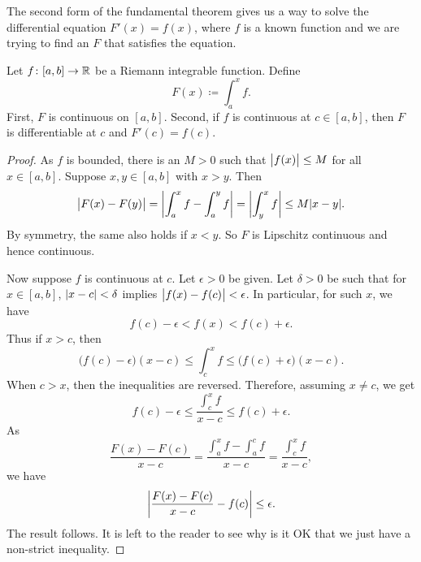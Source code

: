 The second form of the fundamental theorem gives us a way to solve
the differential equation $F'(x) = f(x)$, where $f$ is a known
function and we are trying to find an $F$ that satisfies the equation.

\begin{thm} \label{thm:FTCv2}
Let $f \colon [a,b] \to {\mathbb{R}}$ be a Riemann integrable function.  Define
\begin{equation*}
F(x) \coloneqq \int_a^x f .
\end{equation*}
First, $F$ is continuous on $[a,b]$.  Second,
if $f$ is continuous at $c \in [a,b]$, then $F$ is differentiable at $c$
and $F'(c) = f(c)$.
\end{thm}

\begin{proof}
As $f$ is bounded, there is an $M > 0$
such that $\bigl\lvert {f(x)} \bigr\rvert \leq M$ for all $x \in [a,b]$.  Suppose $x,y \in [a,b]$
with $x > y$.  Then
\begin{equation*}
\bigl\lvert {F(x)-F(y)} \bigr\rvert =
\left\lvert {\int_a^x f - \int_a^y f} \right\rvert
=
\left\lvert {\int_y^x f} \right\rvert
\leq
M\lvert {x-y} \rvert .
\end{equation*}
By symmetry, the same also holds if $x < y$.
So $F$ is Lipschitz continuous and hence continuous.

Now suppose $f$ is continuous at $c$.
Let $\epsilon > 0$ be given.  Let $\delta > 0$ be such that
for $x \in [a,b]$,
$\lvert {x-c} \rvert < \delta$ implies $\bigl\lvert {f(x)-f(c)} \bigr\rvert < \epsilon$.
In particular,
for such $x$, we have
\begin{equation*}
f(c)-\epsilon < f(x) < f(c) + \epsilon.
\end{equation*}
Thus if $x > c$, then
\begin{equation*}
\bigl(f(c)-\epsilon\bigr) (x-c) \leq \int_c^x f \leq
\bigl(f(c) + \epsilon\bigr)(x-c).
\end{equation*}
When $c > x$, then the inequalities are reversed.  Therefore,
assuming $x \neq c$, we get
\begin{equation*}
f(c)-\epsilon
\leq
\frac{\int_c^{x} f}{x-c}
\leq
f(c)+\epsilon .
\end{equation*}
As 
\begin{equation*}
\frac{F(x)-F(c)}{x-c}
=
\frac{\int_a^{x} f - \int_a^{c} f}{x-c}
=
\frac{\int_c^{x} f}{x-c} ,
\end{equation*}
we have 
\begin{equation*}
\left\lvert {\frac{F(x)-F(c)}{x-c} - f(c)} \right\rvert \leq \epsilon .
\end{equation*}
The result follows.  It is left to the reader to see why is it OK that we
just have a non-strict inequality.
\end{proof}

